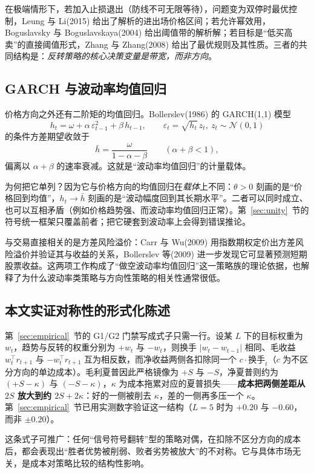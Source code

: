 在极端情形下，若加入止损退出（防线不可无限等待），问题变为双停时最优控制，Leung 与 Li(2015) 给出了解析的进出场价格区间\cite{leungli2015}；若允许幂效用，Boguslavsky 与 Boguslavskaya(2004) 给出阈值带的解析解\cite{boguslavsky2004}；若目标是“低买高卖”的直接阈值形式，Zhang 与 Zhang(2008) 给出了最优规则及其性质\cite{zhangzhang2008}。三者的共同结构是：\emph{反转策略的核心决策变量是带宽，而非方向}。

\subsection{GARCH 与波动率均值回归}

价格方向之外还有二阶矩的均值回归。Bollerslev(1986) 的 GARCH(1,1) 模型
\begin{equation}
h_t=\omega+\alpha\,\varepsilon_{t-1}^2+\beta\,h_{t-1},\qquad
\varepsilon_t=\sqrt{h_t}\,z_t,\ z_t\sim \mathcal N(0,1)
\end{equation}
的条件方差期望收敛于
\begin{equation}
\bar h=\frac{\omega}{1-\alpha-\beta}\qquad(\alpha+\beta<1),
\end{equation}
偏离以 $\alpha+\beta$ 的速率衰减。这就是“波动率均值回归”的计量载体。

为何把它单列？因为它与价格方向的均值回归在\emph{载体}上不同：$\theta>0$ 刻画的是“价格回到均值”，$h_t\to\bar h$ 刻画的是“波动幅度回到其长期水平”。二者可以同时成立、也可以互相矛盾（例如价格趋势强、而波动率均值回归正常）。第~\ref{sec:unity}~节的符号统一框架只覆盖前者；把它硬套到波动率上会得到错误推论。

与交易直接相关的是方差风险溢价：Carr 与 Wu(2009) 用指数期权定价出方差风险溢价并验证其与收益的关系\cite{carrwu2009}，Bollerslev 等(2009) 进一步发现它可显著预测短期股票收益\cite{bollerslev2009}。这两项工作构成了“做空波动率均值回归”这一策略族的理论依据，也解释了为什么波动率类策略与方向性策略的相关性通常很低。

\subsection{本文实证对称性的形式化陈述}

第~\ref{sec:empirical}~节的 G1/G2 门禁写成式子只需一行。设某 $L$ 下的目标权重为 $w_t$，趋势与反转的权重分别为 $+w_t$ 与 $-w_t$，则换手 $|w_t-w_{t-1}|$ 相同、毛收益 $w_t^\top r_{t+1}$ 与 $-w_t^\top r_{t+1}$ 互为相反数，而净收益两侧各扣除同一个 $c\cdot\text{换手}_t$（$c$ 为不区分方向的单边成本）。毛利夏普因此严格镜像为 $+S$ 与 $-S$，净夏普则约为 $(+S-\kappa)$ 与 $(-S-\kappa)$，$\kappa$ 为成本拖累对应的夏普损失——\textbf{成本把两侧差距从 $2S$ 放大到约 $2S+2\kappa$}：好的一侧被削去 $\kappa$，差的一侧再多压一个 $\kappa$。第~\ref{sec:empirical}~节已用实测数字验证这一结构（$L=5$ 时为 $+0.20$ 与 $-0.60$，而非 $\pm0.20$）。

这条式子可推广：任何“信号符号翻转”型的策略对偶，在扣除不区分方向的成本后，都会表现出“胜者优势被削弱、败者劣势被放大”的不对称。它与具体市场无关，是成本对策略比较的结构性影响。
